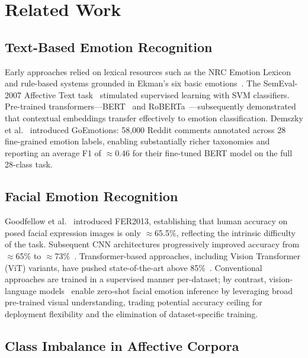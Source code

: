 \documentclass[conference]{IEEEtran}
\begin{document}
\section{Related Work}
\label{sec:related}

\subsection{Text-Based Emotion Recognition}

Early approaches relied on lexical resources such as the NRC
Emotion Lexicon~\cite{mohammad2013crowdsourcing} and rule-based
systems grounded in Ekman's six basic
emotions~\cite{ekman1992}.
The SemEval-2007 Affective Text task~\cite{strapparava2007semeval}
stimulated supervised learning with SVM classifiers.
Pre-trained transformers---BERT~\cite{devlin2019bert} and
RoBERTa~\cite{liu2019roberta}---subsequently demonstrated that
contextual embeddings transfer effectively to emotion classification.
Demszky et al.~\cite{demszky2020goemotions} introduced
GoEmotions: 58,000 Reddit comments annotated across 28 fine-grained
emotion labels, enabling substantially richer taxonomies and
reporting an average F1 of $\approx$0.46 for their fine-tuned
BERT model on the full 28-class task.

\subsection{Facial Emotion Recognition}

Goodfellow et al.~\cite{goodfellow2013fer} introduced FER2013,
establishing that human accuracy on posed facial expression images
is only $\approx$65.5\%, reflecting the intrinsic difficulty of
the task.
Subsequent CNN architectures progressively improved accuracy from
$\approx$65\% to $\approx$73\%~\cite{li2022fer_survey}.
Transformer-based approaches, including Vision Transformer (ViT)
variants, have pushed state-of-the-art above
85\%~\cite{li2022fer_survey}.
Conventional approaches are trained in a supervised manner
per-dataset; by contrast, vision-language
models~\cite{alayrac2022flamingo} enable zero-shot facial
emotion inference by leveraging broad pre-trained visual
understanding, trading potential accuracy ceiling for
deployment flexibility and the elimination of dataset-specific
training.

\subsection{Class Imbalance in Affective Corpora}
\end{document}

